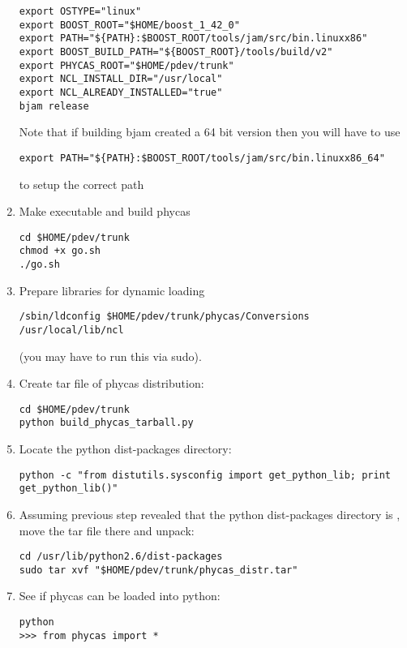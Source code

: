 \begin{enumerate}
\begin{verbatim}
export OSTYPE="linux"
export BOOST_ROOT="$HOME/boost_1_42_0"
export PATH="${PATH}:$BOOST_ROOT/tools/jam/src/bin.linuxx86"
export BOOST_BUILD_PATH="${BOOST_ROOT}/tools/build/v2"
export PHYCAS_ROOT="$HOME/pdev/trunk"
export NCL_INSTALL_DIR="/usr/local"
export NCL_ALREADY_INSTALLED="true"
bjam release
\end{verbatim}

Note that if building bjam created a 64 bit version then you will have to use
\begin{verbatim}
export PATH="${PATH}:$BOOST_ROOT/tools/jam/src/bin.linuxx86_64"
\end{verbatim}
to setup the correct path


%
\item Make  executable and build phycas
\begin{verbatim}
cd $HOME/pdev/trunk
chmod +x go.sh
./go.sh
\end{verbatim}
%
\item Prepare libraries for dynamic loading
\begin{verbatim}
/sbin/ldconfig $HOME/pdev/trunk/phycas/Conversions /usr/local/lib/ncl
\end{verbatim}
(you may have to run this via sudo).
%
\item Create tar file of phycas distribution:
\begin{verbatim}
cd $HOME/pdev/trunk
python build_phycas_tarball.py
\end{verbatim}
%
\item Locate the python dist-packages directory:
\begin{verbatim}
python -c "from distutils.sysconfig import get_python_lib; print get_python_lib()"
\end{verbatim}
%
\item Assuming previous step revealed that the python dist-packages directory is , move the tar file there and unpack:
\begin{verbatim}
cd /usr/lib/python2.6/dist-packages
sudo tar xvf "$HOME/pdev/trunk/phycas_distr.tar"
\end{verbatim}
%
\item See if phycas can be loaded into python:
\begin{verbatim}
python
>>> from phycas import *
\end{verbatim}
\end{enumerate}
